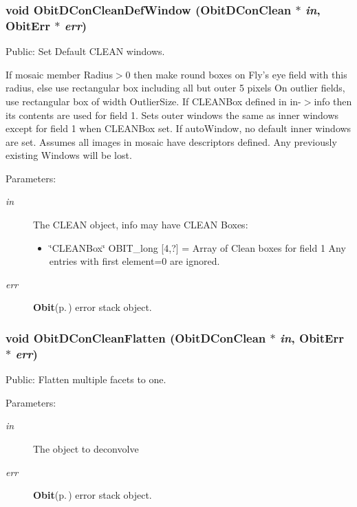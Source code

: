 \subsubsection{\setlength{\rightskip}{0pt plus 5cm}void Obit\-DCon\-Clean\-Def\-Window ({\bf Obit\-DCon\-Clean} $\ast$ {\em in}, {\bf Obit\-Err} $\ast$ {\em err})}\label{ObitDConClean_8c_a19}


Public: Set Default CLEAN windows. 

If mosaic member Radius$>$0 then make round boxes on Fly's eye field with this radius, else use rectangular box including all but outer 5 pixels On outlier fields, use rectangular box of width Outlier\-Size. If CLEANBox defined in in-$>$info then its contents are used for field 1. Sets outer windows the same as inner windows except for field 1 when CLEANBox set. If auto\-Window, no default inner windows are set. Assumes all images in mosaic have descriptors defined. Any previously existing Windows will be lost. \begin{Desc}
\item[Parameters:]
\begin{description}
\item[{\em in}]The CLEAN object, info may have CLEAN Boxes: \begin{itemize}
\item \char`\"{}CLEANBox\char`\"{} OBIT\_\-long [4,?] = Array of Clean boxes for field 1 Any entries with first element=0 are ignored.\end{itemize}
\item[{\em err}]{\bf Obit}{\rm (p.\,\pageref{structObit})} error stack object. \end{description}
\end{Desc}
\subsubsection{\setlength{\rightskip}{0pt plus 5cm}void Obit\-DCon\-Clean\-Flatten ({\bf Obit\-DCon\-Clean} $\ast$ {\em in}, {\bf Obit\-Err} $\ast$ {\em err})}\label{ObitDConClean_8c_a25}


Public: Flatten multiple facets to one. 

\begin{Desc}
\item[Parameters:]
\begin{description}
\item[{\em in}]The object to deconvolve \item[{\em err}]{\bf Obit}{\rm (p.\,\pageref{structObit})} error stack object. \end{description}
\end{Desc}
